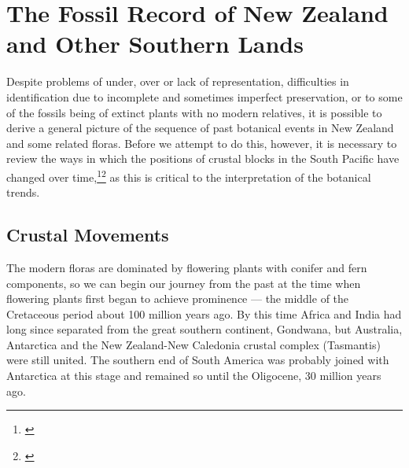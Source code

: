 \section{The Fossil Record of New Zealand and Other Southern Lands}

Despite problems of under, over or lack of representation, difficulties in identification due to incomplete and sometimes imperfect preservation, or to some of the fossils being of extinct plants with no modern relatives, it is possible to derive a general picture of the sequence of past botanical events in New Zealand and some related floras.
Before we attempt to do this, however, it is necessary to review the ways in which the positions of crustal blocks in the South Pacific have changed over time,\footnote{\cite{kemp1978tertiary}}\footnote{\cite{crook1981break}} as this is critical to the interpretation of the botanical trends.

\subsection{Crustal Movements}

The modern floras are dominated by flowering plants with conifer and fern components, so we can begin our journey from the past at the time when flowering plants first began to achieve prominence — the middle of the Cretaceous period about 100 million years ago.
By this time Africa and India had long since separated from the great southern continent, Gondwana, but Australia, Antarctica and the New Zealand-New Caledonia crustal complex (Tasmantis) were still united.
The southern end of South America was probably joined with Antarctica at this stage and remained so until the Oligocene, 30 million years ago.

